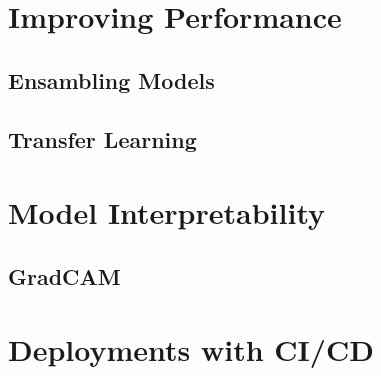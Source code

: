 \section{Improving Performance}
\subsection{Ensambling Models}
\subsection{Transfer Learning}

\section{Model Interpretability}
\subsection{GradCAM}

\section{Deployments with CI/CD}
